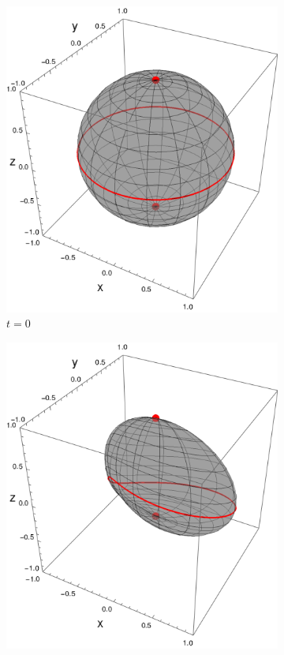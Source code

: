     \begin{figure}[ht!]
      \centering
      \begin{subfigure}{0.32\textwidth}
        \centering
        \includegraphics[width=0.9\linewidth]{chapter3/figures_toy/sphere_CNOT_t=0._r=0.9_p=0.1.png}
        \caption{$t=0$}
      \end{subfigure}%
      \begin{subfigure}{0.32\textwidth}
        \centering
        \includegraphics[width=0.9\linewidth]{chapter3/figures_toy/sphere_CNOT_t=0.5_r=0.9_p=0.5.png}

\end{subfigure}
\end{figure}
